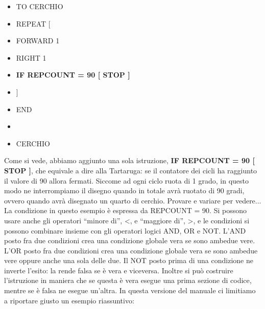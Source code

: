 \vskip 1cm

\begin{scriptsize}
\begin{minipage}{0.50\textwidth}
\begin{itemize}[itemsep=-3pt,parsep=2pt, leftmargin=-0.0mm ]
\item[] TO CERCHIO                 
\item[] \hspace{8pt} 	REPEAT [ 
\item[] \hspace{8pt}\hspace{8pt}		FORWARD 1 
\item[] \hspace{8pt}\hspace{8pt}		RIGHT 1
\item[]	\hspace{8pt}\hspace{8pt}		\textbf{IF REPCOUNT = 90 [ STOP ]}
\item[] \hspace{8pt}	]
\item[] END                            
\item[] 
\item[] CERCHIO                       
\end{itemize}
\end{minipage}
\end{scriptsize}

\vskip 1cm

Come si vede, abbiamo aggiunto una sola istruzione, \textbf{IF REPCOUNT = 90 [ STOP ]}, che equivale a dire alla Tartaruga: se il contatore dei cicli ha raggiunto il valore di 90 allora fermati. Siccome ad ogni ciclo ruota di 1 grado, in questo modo ne interrompiamo il disegno quando in totale avrà ruotato di 90 gradi, ovvero quando avrà disegnato un quarto di cerchio. Provare e variare per vedere...
La condizione in questo esempio è espressa da REPCOUNT = 90. Si  possono usare anche gli operatori “minore di”, <, e “maggiore di”, >, e le condizioni si possono combinare insieme con gli operatori logici AND, OR e NOT. L'AND posto fra due condizioni crea una condizione globale vera se sono ambedue vere. L'OR posto fra due condizioni crea una condizione globale vera se sono ambedue vere oppure anche una sola delle due. Il NOT posto prima di una condizione ne inverte l'esito: la rende falsa se è vera e viceversa. Inoltre si può costruire l'istruzione in maniera che se questa è vera esegue una prima sezione di codice, mentre se è falsa ne  esegue un'altra. In questa versione del manuale ci limitiamo a riportare giusto un esempio riassuntivo:

